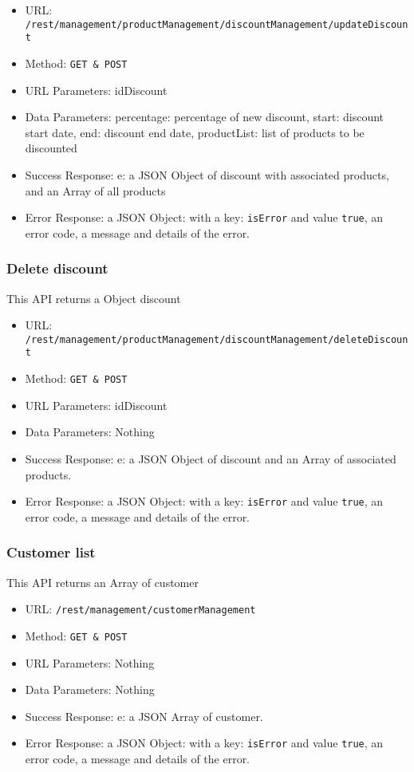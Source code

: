 \begin{itemize}
    \item URL: \texttt{/rest/management/productManagement/discountManagement/updateDiscount}
    \item Method: \texttt{{GET \& POST}}
    \item URL Parameters: idDiscount
    \item Data Parameters: percentage: percentage of new discount, start: discount start date, end: discount end date, productList: list of products to be discounted
    \item Success Response: e: a JSON Object of discount with associated products, and an Array of all products 
    \item Error Response: a JSON Object: with a key: \texttt{isError}  and value \texttt{true}, an error code, a message and details of the error.
\end{itemize}

\subsubsection*{Delete discount}
This API returns a Object discount

\begin{itemize}
    \item URL: \texttt{/rest/management/productManagement/discountManagement/deleteDiscount}
    \item Method: \texttt{{GET \& POST}}
    \item URL Parameters: idDiscount
    \item Data Parameters: Nothing
    \item Success Response: e: a JSON Object of discount and an Array of associated products. 
    \item Error Response: a JSON Object: with a key: \texttt{isError}  and value \texttt{true}, an error code, a message and details of the error.
\end{itemize}

\subsubsection*{Customer list}
This API returns an Array of customer

\begin{itemize}
    \item URL: \texttt{/rest/management/customerManagement}
    \item Method: \texttt{{GET \& POST}}
    \item URL Parameters: Nothing
    \item Data Parameters: Nothing
    \item Success Response: e: a JSON Array of customer.
    \item Error Response: a JSON Object: with a key: \texttt{isError}  and value \texttt{true}, an error code, a message and details of the error.
\end{itemize}

